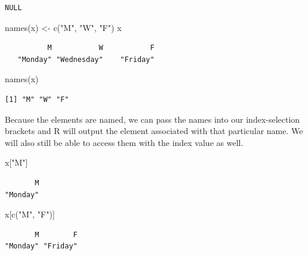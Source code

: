 \documentclass[
  letterpaper,
  DIV=11,
  numbers=noendperiod]{scrreprt}
\newenvironment{Shaded}{\begin{snugshade}}{\end{snugshade}}
\newcommand{\FunctionTok}[1]{\textcolor[rgb]{0.28,0.35,0.67}{#1}}
\newcommand{\NormalTok}[1]{\textcolor[rgb]{0.00,0.23,0.31}{#1}}
\newcommand{\OtherTok}[1]{\textcolor[rgb]{0.00,0.23,0.31}{#1}}
\newcommand{\StringTok}[1]{\textcolor[rgb]{0.13,0.47,0.30}{#1}}
\begin{document}
\begin{verbatim}
NULL
\end{verbatim}

\begin{Shaded}
\begin{Highlighting}[]
\FunctionTok{names}\NormalTok{(x) }\OtherTok{\textless{}{-}} \FunctionTok{c}\NormalTok{(}\StringTok{"M"}\NormalTok{, }\StringTok{"W"}\NormalTok{, }\StringTok{"F"}\NormalTok{)}
\NormalTok{x}
\end{Highlighting}
\end{Shaded}

\begin{verbatim}
          M           W           F 
   "Monday" "Wednesday"    "Friday" 
\end{verbatim}

\begin{Shaded}
\begin{Highlighting}[]
\FunctionTok{names}\NormalTok{(x)}
\end{Highlighting}
\end{Shaded}

\begin{verbatim}
[1] "M" "W" "F"
\end{verbatim}

Because the elements are named, we can pass the names into our
index-selection brackets and R will output the element associated with
that particular name. We will also still be able to access them with the
index value as well.

\begin{Shaded}
\begin{Highlighting}[]
\NormalTok{x[}\StringTok{"M"}\NormalTok{]}
\end{Highlighting}
\end{Shaded}

\begin{verbatim}
       M 
"Monday" 
\end{verbatim}

\begin{Shaded}
\begin{Highlighting}[]
\NormalTok{x[}\FunctionTok{c}\NormalTok{(}\StringTok{"M"}\NormalTok{, }\StringTok{"F"}\NormalTok{)]}
\end{Highlighting}
\end{Shaded}

\begin{verbatim}
       M        F 
"Monday" "Friday" 
\end{verbatim}
\end{document}
